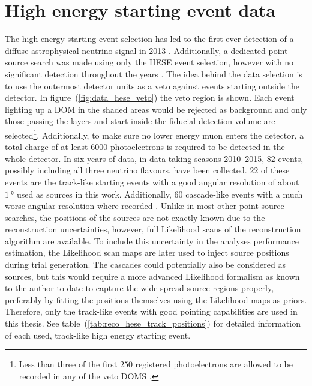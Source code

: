 \section{High energy starting event data}
The high energy starting event selection has led to the first-ever detection of a diffuse astrophysical neutrino signal in 2013 \cite{Aartsen:2013jdh}.
Additionally, a dedicated point source search was made using only the HESE event selection, however with no significant detection throughout the years \cite{Aartsen:2013rt,Aartsen:2014gkd,Kopper:2015vzf,Kopper:2017zzm}.
The idea behind the data selection is to use the outermost detector units as a veto against events starting outside the detector.
In figure~(\ref{fig:data_hese_veto}) the veto region is shown.
Each event lighting up a DOM in the shaded areas would be rejected as background and only those passing the layers and start inside the fiducial detection volume are selected\footnote{Less than three of the first $\num{250}$ registered photoelectrons are allowed to be recorded in any of the veto DOMS \cite{Kopper:2017zzm}.}.
Additionally, to make sure no lower energy muon enters the detector, a total charge of at least $\num{6000}$ photoelectrons is required to be detected in the whole detector.
In six years of data, in data taking seasons 2010--2015, $\num{82}$ events, possibly including all three neutrino flavours, have been collected.
$\num{22}$ of these events are the track-like starting events with a good angular resolution of about $\SI{1}{\degree}$ used as sources in this work.
Additionally, $\num{60}$ cascade-like events with a much worse angular resolution where recorded \cite{Kopper:2017zzm}.
Unlike in most other point source searches, the positions of the sources are not exactly known due to the reconstruction uncertainties, however, full Likelihood scans of the reconstruction algorithm are available.
To include this uncertainty in the analyses performance estimation, the Likelihood scan maps are later used to inject source positions during trial generation.
The cascades could potentially also be considered as sources, but this would require a more advanced Likelihood formalism as known to the author to-date to capture the wide-spread source regions properly, preferably by fitting the positions themselves using the Likelihood maps as priors.
Therefore, only the track-like events with good pointing capabilities are used in this thesis.
See table~(\ref{tab:reco_hese_track_positions}) for detailed information of each used, track-like high energy starting event.

